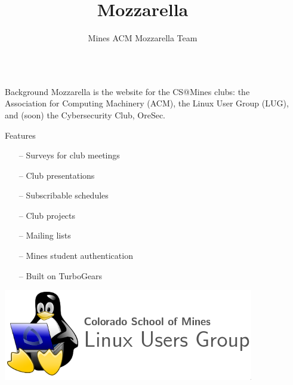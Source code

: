 \documentclass[final]{beamer}
\title{Mozzarella}
\author{Mines ACM Mozzarella Team}
\institute{Department of Computer Science, Colorado School of Mines}
\newlength{\sepwid}
\newlength{\onecolwid}
\begin{document}

    \setlength{\belowcaptionskip}{2ex} %
    \setlength\belowdisplayshortskip{2ex} %

    \begin{frame}[t] %
        \begin{columns}[t]
            \begin{column}{\sepwid}\end{column} %

            \begin{column}{\onecolwid} %

                \begin{block}{Background}
                    Mozzarella is the website for the CS@Mines clubs: the
		    Association for Computing Machinery (ACM), the Linux User
		    Group (LUG), and (soon) the Cybersecurity Club, OreSec.
                \end{block}

                \begin{block}{Features}
                    \begin{itemize}[leftmargin=8.75cm, labelsep=1cm]
                        \item[--] Surveys for club meetings
                        \item[--] Club presentations
                        \item[--] Subscribable schedules
                        \item[--] Club projects
                        \item[--] Mailing lists
                        \item[--] Mines student authentication
                        \item[--] Built on TurboGears
                    \end{itemize}
                \end{block}
		\includegraphics[width=.95\linewidth]{lug-logo.png}


\end{column}
\end{columns}
\end{frame}
\end{document}
